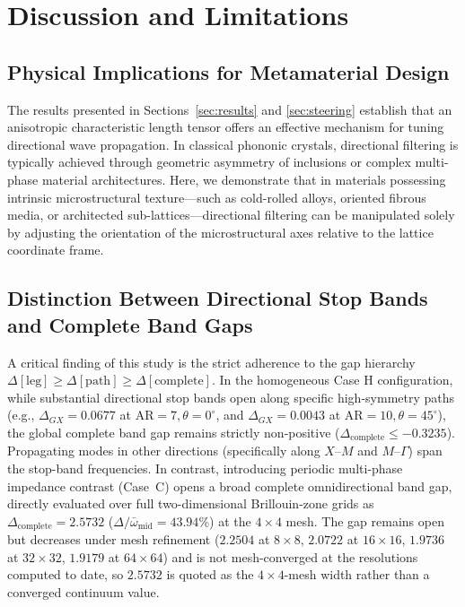 \section{Discussion and Limitations}
\label{sec:discussion}

\subsection{Physical Implications for Metamaterial Design}
The results presented in Sections~\ref{sec:results} and \ref{sec:steering} establish that an anisotropic characteristic length tensor offers an effective mechanism for tuning directional wave propagation. In classical phononic crystals, directional filtering is typically achieved through geometric asymmetry of inclusions or complex multi-phase material architectures. Here, we demonstrate that in materials possessing intrinsic microstructural texture---such as cold-rolled alloys, oriented fibrous media, or architected sub-lattices---directional filtering can be manipulated solely by adjusting the orientation of the microstructural axes relative to the lattice coordinate frame.

\subsection{Distinction Between Directional Stop Bands and Complete Band Gaps}
A critical finding of this study is the strict adherence to the gap hierarchy $\Delta[\mathrm{leg}] \ge \Delta[\mathrm{path}] \ge \Delta[\mathrm{complete}]$. In the homogeneous Case H configuration, while substantial directional stop bands open along specific high-symmetry paths (e.g., $\Delta_{GX} = 0.0677$ at $\mathrm{AR} = 7, \theta = 0^\circ$, and $\Delta_{GX} = 0.0043$ at $\mathrm{AR} = 10, \theta = 45^\circ$), the global complete band gap remains strictly non-positive ($\Delta_{\mathrm{complete}} \le -0.3235$). Propagating modes in other directions (specifically along $X$--$M$ and $M$--$\Gamma$) span the stop-band frequencies. In contrast, introducing periodic multi-phase impedance contrast (Case~C) opens a broad complete omnidirectional band gap, directly evaluated over full two-dimensional Brillouin-zone grids as $\Delta_{\mathrm{complete}} = 2.5732$ ($\Delta/\bar{\omega}_{\mathrm{mid}} = 43.94\%$) at the $4\times 4$ mesh. The gap remains open but decreases under mesh refinement ($2.2504$ at $8\times 8$, $2.0722$ at $16\times 16$, $1.9736$ at $32\times 32$, $1.9179$ at $64\times 64$) and is not mesh-converged at the resolutions computed to date, so $2.5732$ is quoted as the $4\times 4$-mesh width rather than a converged continuum value.

